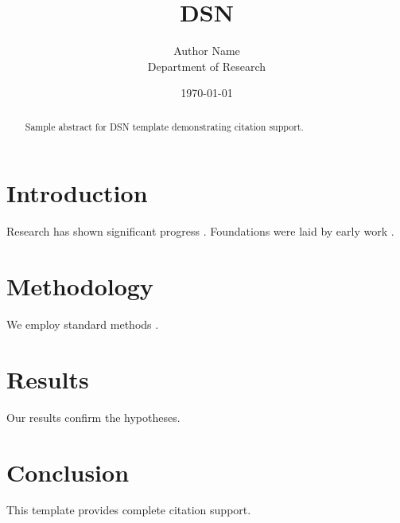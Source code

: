 \documentclass{article}
\title{DSN}
\author{Author Name \\ \small Department of Research}
\date{\today}
\begin{document}
\maketitle

\begin{abstract}
Sample abstract for DSN template demonstrating citation support.
\end{abstract}

\section{Introduction}
Research has shown significant progress \citep{einstein1905}. Foundations were laid by early work \citep{turing1950}.

\section{Methodology}
We employ standard methods \citep{knuth1984}.

\section{Results}
Our results confirm the hypotheses.

\section{Conclusion}
This template provides complete citation support.



\end{document}
